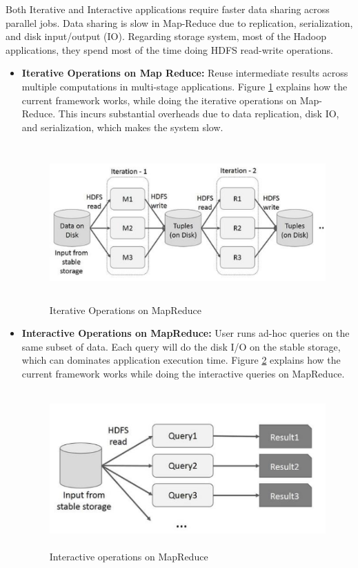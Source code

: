 Both Iterative and Interactive applications require faster data sharing across parallel jobs. Data sharing is slow in Map-Reduce due to replication, serialization, and disk input/output (IO). Regarding storage system, most of the Hadoop applications, they spend most of the time doing HDFS read-write operations.
\begin{itemize}
\item \textbf{Iterative Operations on Map Reduce:} Reuse intermediate results across multiple computations in multi-stage applications. Figure \ref{iterative} explains how the current framework works, while doing the iterative operations on Map-Reduce. This incurs substantial overheads due to data replication, disk IO, and serialization, which makes the system slow.

\begin{figure}[H]
\begin{center}
\includegraphics[width=14cm,height=6cm]{chapter2/fig4.png}
\end{center}
\caption{Iterative Operations on MapReduce}
\label{iterative}
\end{figure}

\item \textbf{Interactive Operations on MapReduce:} User runs ad-hoc queries on the same subset of data. Each query will do the disk I/O on the stable storage, which can dominates application execution time. Figure \ref{interactive} explains how the current framework works while doing the interactive queries on MapReduce.

\begin{figure}[H]
\begin{center}
\includegraphics[width=14cm,height=6cm]{chapter2/fig5.png}
\end{center}
\caption{Interactive operations on MapReduce}
\label{interactive}
\end{figure}


\end{itemize}
